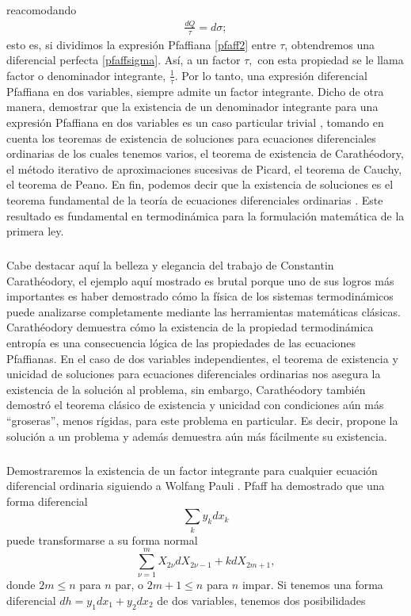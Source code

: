 \documentclass{article}
\theoremstyle{definition} \newtheorem{defi}{Definici\'on}
\theoremstyle{definition} \newtheorem{teo}{Teorema}
\theoremstyle{definition} \newtheorem{cor}{Corolario}
\begin{document}
reacomodando
\begin{align}
\frac{dQ}{\tau} = d\sigma;
\end{align}
esto es, si dividimos la expresi\'on Pfaffiana \eqref{pfaff2} entre $\tau$, obtendremos una diferencial perfecta \eqref{pfaffsigma}. As\'i, a un factor $\tau,$ con esta propiedad se le llama factor o denominador integrante, $\frac{1}{\tau}$. Por lo tanto, una expresi\'on diferencial Pfaffiana en dos variables, siempre admite un factor integrante. Dicho de otra manera, demostrar que la existencia de un denominador integrante para una expresi\'on Pfaffiana en dos variables es un caso particular trivial \cite{MB}, tomando en cuenta los teoremas de existencia de soluciones para ecuaciones diferenciales ordinarias de los cuales tenemos varios, el teorema de existencia de Carath\'eodory, el m\'etodo iterativo de aproximaciones sucesivas de Picard, el teorema de Cauchy, el teorema de Peano. En fin, podemos decir que la existencia de soluciones es el teorema fundamental de la teor\'ia de ecuaciones diferenciales ordinarias \cite{CE}. Este resultado es fundamental en termodin\'amica para la formulaci\'on matem\'atica de la primera ley.
\subparagraph{}
Cabe destacar aqu\'i la belleza y elegancia del trabajo de Constantin Carath\'eodory, el ejemplo aqu\'i mostrado es brutal porque uno de sus logros m\'as importantes es haber demostrado c\'omo la f\'isica de los sistemas termodin\'amicos puede analizarse completamente mediante las herramientas matem\'aticas cl\'asicas. Carath\'eodory demuestra c\'omo la existencia de la propiedad termodin\'amica entrop\'ia es una consecuencia l\'ogica de las propiedades de las ecuaciones Pfaffianas. En el caso de dos variables independientes, el teorema de existencia y unicidad de soluciones para ecuaciones diferenciales ordinarias nos asegura la existencia de la soluci\'on al problema, sin embargo, Carath\'eodory tambi\'en demostr\'o el teorema cl\'asico de existencia y unicidad con condiciones a\'un m\'as ``groseras'', menos r\'igidas, para este problema en particular. Es decir, propone la soluci\'on a un problema y adem\'as demuestra a\'un m\'as f\'acilmente su existencia. 
\subparagraph{}
Demostraremos la existencia de un factor integrante para cualquier ecuaci\'on diferencial ordinaria siguiendo a Wolfang Pauli \cite{PW}. Pfaff ha demostrado que una forma diferencial $$\sum_k y_kdx_k$$ puede transformarse a su forma normal $$\sum_{\nu=1}^mX_{2\nu}dX_{2\nu-1} + kdX_{2m+1},$$ donde $2m\le n$ para $n$ par, o $2m+1\le n$ para $n$ impar. Si tenemos una forma diferencial $dh=y_1dx_1+y_2dx_2$ de dos variables, tenemos dos posibilidades
\end{document}
